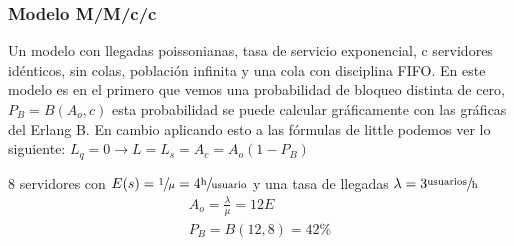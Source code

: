 \subsubsection{Modelo M/M/c/c}
Un modelo con llegadas poissonianas, tasa de servicio exponencial, c servidores idénticos, sin colas, población infinita y una cola con disciplina FIFO. En este modelo es en el primero que vemos una probabilidad de bloqueo distinta de cero, $P_B=B(A_o,c)$ esta probabilidad se puede calcular gráficamente con las gráficas del Erlang B. En cambio aplicando esto a las fórmulas de little podemos ver lo siguiente: $L_q=0\to L=L_s=A_c=A_o(1-P_B)$\\
\begin{example}[M/M/c/c]
8 servidores con $E(s)=\sfrac{1}{\mu}=4\sfrac{\text{h}}{\text{usuario}}$ y una tasa de llegadas $\lambda=3\sfrac{\text{usuarios}}{\text{h}}$\\
\begin{gather*}
A_o=\frac{\lambda}{\mu}=12E\\
P_B=B(12,8)=42\%
\end{gather*}
\end{example}